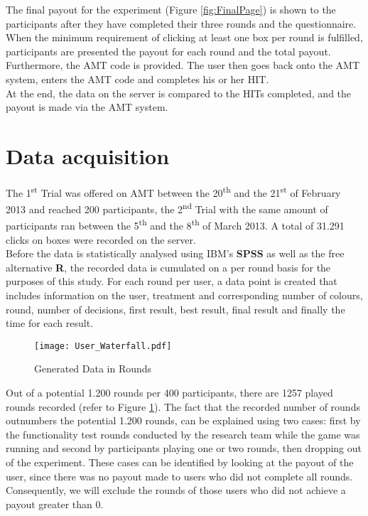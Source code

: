 The final payout for the experiment (Figure \ref{fig:FinalPage}) is shown to the participants after they have completed their three rounds and the questionnaire. \\
When the minimum requirement of clicking at least one box per round is fulfilled, participants are presented the payout for each round and the total payout. Furthermore, the \ac{AMT} code is provided.
The user then goes back onto the \ac{AMT} system, enters the \ac{AMT} code and completes his or her \ac{HIT}.\\
At the end, the data on the server is compared to the \ac{HIT}s completed, and the payout is made via the \ac{AMT} system.

\section{Data acquisition}
\label{ch:Experiment:sec:DataacquisitionDescriptives}
The 1\textsuperscript{st} Trial was offered on \ac{AMT} between the 20\textsuperscript{th} and the 21\textsuperscript{st} of February 2013 and reached 200 participants, the 2\textsuperscript{nd} Trial with the same amount of participants ran between the 5\textsuperscript{th} and the 8\textsuperscript{th} of March 2013. A total of 31.291 clicks on boxes were recorded on the server.\\
Before the data is statistically analysed using IBM's \textbf{SPSS} as well as the free alternative \textbf{R}, the recorded data is cumulated on a per round basis for the purposes of this study. For each round per user, a data point is created that includes information on the user, treatment and corresponding number of colours, round, number of decisions, first result, best result, final result and finally the time for each result.
 \begin{figure}[htp] %
\begin{center} %
  \texttt{[image: User\_Waterfall.pdf]}
  \caption{Generated Data in Rounds}
  \label{Data}
\end{center}
\end{figure}
Out of a potential 1.200 rounds per 400 participants, there are 1257 played rounds recorded (refer to Figure \ref{Data}). The fact that the recorded number of rounds outnumbers the potential 1.200 rounds, can be explained using two cases: first by the functionality test rounds conducted by the research team while the game was running and second by participants playing one or two rounds, then dropping out of the experiment. These cases can be identified by looking at the payout of the user, since there was no payout made to users who did not complete all rounds. Consequently, we will exclude the rounds of those users who did not achieve a payout greater than 0.\\

